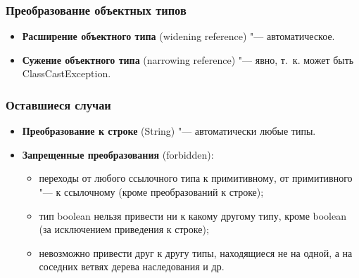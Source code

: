 \documentclass[default]{beamer}
\begin{document}
	\begin{frame}
		\frametitle{Преобразование объектных типов}
		
		\begin{itemize}
			\item \textbf{Расширение объектного типа} (widening reference) "--- автоматическое.
			\item \textbf{Сужение объектного типа} (narrowing reference) "--- явно, т.~к. может быть ClassCastException.
		\end{itemize}
		
		\lstCastingObj
	\end{frame}

	\begin{frame}
	\frametitle{Оставшиеся случаи}
	
		\begin{itemize}
			\item \textbf{Преобразование к строке} (String) "--- автоматически любые типы.
			\item \textbf{Запрещенные преобразования} (forbidden):
			\begin{itemize}
				\item переходы от любого ссылочного типа к примитивному, от примитивного "--- к ссылочному (кроме преобразований к строке);
				\item тип boolean нельзя привести ни к какому другому типу, кроме boolean (за исключением приведения к строке);
				\item невозможно привести друг к другу типы, находящиеся не на одной, а на соседних ветвях дерева наследования и др.
			\end{itemize}
		\end{itemize}
	\end{frame}	
	
\end{document}
